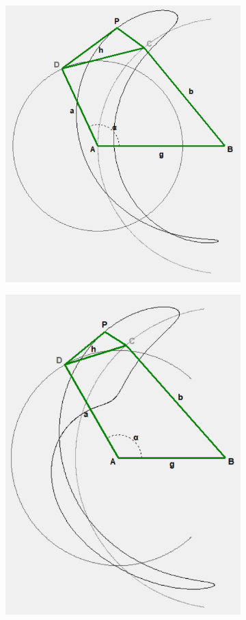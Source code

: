 \documentclass{article}
\begin{document}
\begin{figure}[h]
\begin{subfigure}{0.19\textwidth}
		\caption{}
	\end{subfigure}
	\vfill
	\begin{subfigure}{0.19\textwidth}
		\centering
		\includegraphics[width=\linewidth, height=0.95\linewidth, keepaspectratio]{./Figures/27_motion_cases/010.png}
		\caption{}
	\end{subfigure}
	\hfill
	\begin{subfigure}{0.19\textwidth}
		\centering
		\includegraphics[width=\linewidth, height=0.95\linewidth, keepaspectratio]{./Figures/27_motion_cases/-110.png}

\end{subfigure}
\end{figure}
\end{document}
